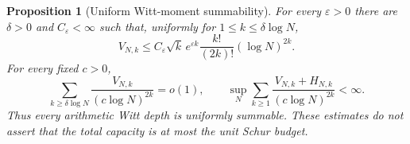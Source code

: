 \documentclass[11pt]{amsart}
\newtheorem{proposition}[theorem]{Proposition}
\theoremstyle{definition}
\theoremstyle{remark}
\begin{document}
\begin{proposition}[Uniform Witt-moment summability]
\label{prop:uniformWittmoments}
For every \(\varepsilon>0\) there are \(\delta>0\) and
\(C_\varepsilon<\infty\) such that, uniformly for
\(1\le k\le\delta\log N\),
\begin{equation}\label{eq:uniformWittsmall}
 V_{N,k}\le C_\varepsilon\sqrt{k}\,e^{\varepsilon k}
 \frac{k!}{(2k)!}(\log N)^{2k}.
\end{equation}
For every fixed \(c>0\),
\begin{equation}\label{eq:uniformWittlarge}
 \sum_{k\ge\delta\log N}\frac{V_{N,k}}{(c\log N)^{2k}}=o(1),
 \qquad
 \sup_N\sum_{k\ge1}\frac{V_{N,k}+H_{N,k}}{(c\log N)^{2k}}<\infty.
\end{equation}
Thus every arithmetic Witt depth is uniformly summable.  These estimates
do not assert that the total capacity is at most the unit Schur budget.
\end{proposition}
\end{document}

